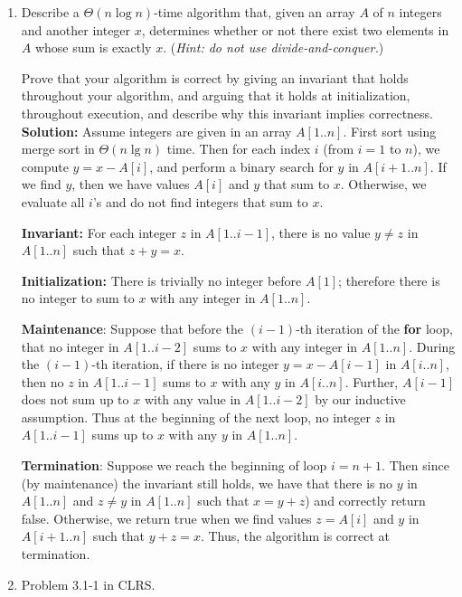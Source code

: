 \documentclass[letterpaper,11pt]{article}
\begin{document}
\begin{enumerate}
\item Describe a $\Theta(n\log n)$-time algorithm that, given an array $A$ of $n$ integers and another integer $x$, determines whether or not there exist two elements in $A$ whose sum is exactly $x$. (\emph{Hint: do not use divide-and-conquer.})

Prove that your algorithm is correct by giving an invariant that holds throughout your algorithm, and arguing that it holds at initialization, throughout execution, and describe why this invariant implies correctness.\\

{\bf Solution:} Assume integers are given in an array $A[1..n]$. First sort using merge sort in $\Theta(n\lg n)$ time. Then for each index $i$ (from $i=1$ to $n$), we compute $y= x-A[i]$, and perform a binary search for $y$ in $A[i+1..n]$. If we find $y$, then we have values $A[i]$ and $y$ that sum to $x$. Otherwise, we evaluate all $i$'s and do not find integers that sum to $x$.

{\bf Invariant:} For each integer $z$ in $A[1..i-1]$, there is no value $y\neq z$ in $A[1..n]$ such that $z+y=x$.

{\bf Initialization:} There is trivially no integer before $A[1]$; therefore there is no integer to sum to $x$ with any integer in $A[1..n]$.

{\bf Maintenance}: Suppose that before the $(i-1)$-th iteration of the \textbf{for} loop, that no integer in $A[1..i-2]$ sums to $x$ with any integer in $A[1..n]$. During the $(i-1)$-th iteration, if there is no integer $y=x-A[i-1]$ in $A[i..n]$, then no $z$ in $A[1..i-1]$ sums to $x$ with any $y$ in $A[i..n]$. Further, $A[i-1]$ does not sum up to $x$ with any value in $A[1..i-2]$ by our inductive assumption. Thus at the beginning of the next loop, no integer $z$ in $A[1..i-1]$ sums up to $x$ with any $y$ in $A[1..n]$.

{\bf Termination}: Suppose we reach the beginning of loop $i=n+1$. Then since (by maintenance) the invariant still holds, we have that there is no $y$ in $A[1..n]$ and $z\neq y$ in $A[1..n]$ such that $x = y+z$) and correctly return false. Otherwise, we return true when we find values $z = A[i]$ and $y$ in $A[i+1..n]$ such that $y+z = x$. Thus, the algorithm is correct at termination.
\newpage



\item Problem 3.1-1 in CLRS.\\


\end{enumerate}
\end{document}
